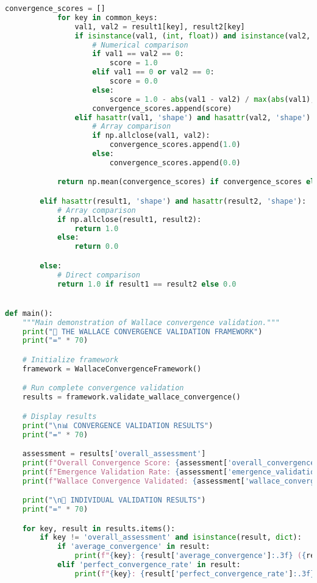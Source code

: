 \begin{lstlisting}[language=Python, caption=Complete Wallace Validation Framework Implementation]
            convergence_scores = []
            for key in common_keys:
                val1, val2 = result1[key], result2[key]
                if isinstance(val1, (int, float)) and isinstance(val2, (int, float)):
                    # Numerical comparison
                    if val1 == val2 == 0:
                        score = 1.0
                    elif val1 == 0 or val2 == 0:
                        score = 0.0
                    else:
                        score = 1.0 - abs(val1 - val2) / max(abs(val1), abs(val2))
                    convergence_scores.append(score)
                elif hasattr(val1, 'shape') and hasattr(val2, 'shape'):
                    # Array comparison
                    if np.allclose(val1, val2):
                        convergence_scores.append(1.0)
                    else:
                        convergence_scores.append(0.0)

            return np.mean(convergence_scores) if convergence_scores else 0.0

        elif hasattr(result1, 'shape') and hasattr(result2, 'shape'):
            # Array comparison
            if np.allclose(result1, result2):
                return 1.0
            else:
                return 0.0

        else:
            # Direct comparison
            return 1.0 if result1 == result2 else 0.0


def main():
    """Main demonstration of Wallace convergence validation."""
    print("🔄 THE WALLACE CONVERGENCE VALIDATION FRAMEWORK")
    print("=" * 70)

    # Initialize framework
    framework = WallaceConvergenceFramework()

    # Run complete convergence validation
    results = framework.validate_wallace_convergence()

    # Display results
    print("\n📊 CONVERGENCE VALIDATION RESULTS")
    print("=" * 70)

    assessment = results['overall_assessment']
    print(f"Overall Convergence Score: {assessment['overall_convergence_score']:.3f}")
    print(f"Emergence Validation Rate: {assessment['emergence_validation_rate']:.3f}")
    print(f"Wallace Convergence Validated: {assessment['wallace_convergence_validated']}")

    print("\n🎯 INDIVIDUAL VALIDATION RESULTS")
    print("=" * 70)

    for key, result in results.items():
        if key != 'overall_assessment' and isinstance(result, dict):
            if 'average_convergence' in result:
                print(f"{key}: {result['average_convergence']:.3f} ({result['validation_status']})")
            elif 'perfect_convergence_rate' in result:
                print(f"{key}: {result['perfect_convergence_rate']:.3f} ({result['validation_status']})")


\end{lstlisting}

